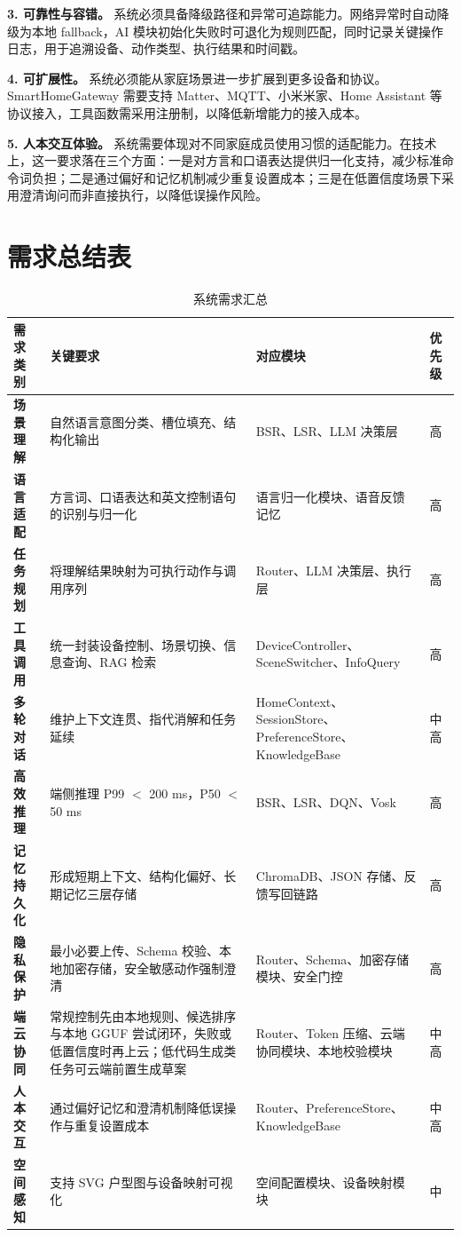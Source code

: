 \documentclass[12pt,a4paper,oneside]{ctexrep}
\begin{document}
\textbf{3. 可靠性与容错。} 系统必须具备降级路径和异常可追踪能力。网络异常时自动降级为本地 fallback，AI 模块初始化失败时可退化为规则匹配，同时记录关键操作日志，用于追溯设备、动作类型、执行结果和时间戳。

\textbf{4. 可扩展性。} 系统必须能从家庭场景进一步扩展到更多设备和协议。SmartHomeGateway 需要支持 Matter、MQTT、小米米家、Home Assistant 等协议接入，工具函数需采用注册制，以降低新增能力的接入成本。

\textbf{5. 人本交互体验。} 系统需要体现对不同家庭成员使用习惯的适配能力。在技术上，这一要求落在三个方面：一是对方言和口语表达提供归一化支持，减少标准命令词负担；二是通过偏好和记忆机制减少重复设置成本；三是在低置信度场景下采用澄清询问而非直接执行，以降低误操作风险。

\section{需求总结表}

\begin{table}[H]
    \centering
    \caption{系统需求汇总}
    \begin{tabularx}{\textwidth}{>{\bfseries}p{2.2cm}X X >{\centering\arraybackslash}p{1.4cm}}
        \toprule
        需求类别 & 关键要求 & 对应模块 & 优先级 \\
        \midrule
        场景理解 & 自然语言意图分类、槽位填充、结构化输出 & BSR、LSR、LLM 决策层 & 高 \\
        语言适配 & 方言词、口语表达和英文控制语句的识别与归一化 & 语言归一化模块、语音反馈记忆 & 高 \\
        任务规划 & 将理解结果映射为可执行动作与调用序列 & Router、LLM 决策层、执行层 & 高 \\
        工具调用 & 统一封装设备控制、场景切换、信息查询、RAG 检索 & DeviceController、SceneSwitcher、InfoQuery & 高 \\
        多轮对话 & 维护上下文连贯、指代消解和任务延续 & HomeContext、SessionStore、PreferenceStore、KnowledgeBase & 中高 \\
        高效推理 & 端侧推理 P99 $<$ 200 ms，P50 $<$ 50 ms & BSR、LSR、DQN、Vosk & 高 \\
        记忆持久化 & 形成短期上下文、结构化偏好、长期记忆三层存储 & ChromaDB、JSON 存储、反馈写回链路 & 高 \\
        隐私保护 & 最小必要上传、Schema 校验、本地加密存储，安全敏感动作强制澄清 & Router、Schema、加密存储模块、安全门控 & 高 \\
        端云协同 & 常规控制先由本地规则、候选排序与本地 GGUF 尝试闭环，失败或低置信度时再上云；低代码生成类任务可云端前置生成草案 & Router、Token 压缩、云端协同模块、本地校验模块 & 中高 \\
        人本交互 & 通过偏好记忆和澄清机制降低误操作与重复设置成本 & Router、PreferenceStore、KnowledgeBase & 中高 \\
        空间感知 & 支持 SVG 户型图与设备映射可视化 & 空间配置模块、设备映射模块 & 中 \\
        \bottomrule
    \end{tabularx}
\end{table}
\end{document}
